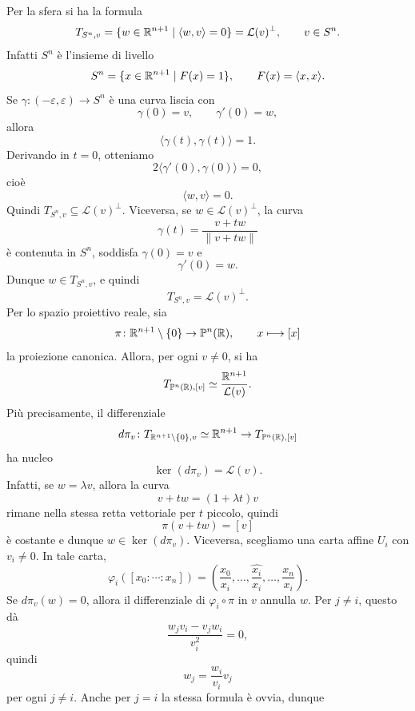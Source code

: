 \documentclass[a4paper]{article}
\begin{document}
\begin{snippetproof}{}
    Per la sfera si ha la formula
    \[
        T_{S^n,v}
        =
        \{w\in\mathbb{R}^{n+1}\mid \langle w,v\rangle=0\}
        =
        \mathcal{L}(v)^\perp,
        \qquad v\in S^n.
    \]
    Infatti \(S^n\) è l'insieme di livello
    \[
        S^n=\{x\in\mathbb{R}^{n+1}\mid F(x)=1\},
        \qquad
        F(x)=\langle x,x\rangle.
    \]
    Se \(\gamma\colon(-\varepsilon,\varepsilon)\to S^n\) è una curva liscia con
    \[
        \gamma(0)=v,
        \qquad
        \gamma'(0)=w,
    \]
    allora
    \[
        \langle\gamma(t),\gamma(t)\rangle=1.
    \]
    Derivando in \(t=0\), otteniamo
    \[
        2\langle\gamma'(0),\gamma(0)\rangle=0,
    \]
    cioè
    \[
        \langle w,v\rangle=0.
    \]
    Quindi \(T_{S^n,v}\subseteq\mathcal{L}(v)^\perp\). Viceversa, se \(w\in\mathcal{L}(v)^\perp\), la curva
    \[
        \gamma(t)=\frac{v+tw}{\left\|v+tw\right\|}
    \]
    è contenuta in \(S^n\), soddisfa \(\gamma(0)=v\) e
    \[
        \gamma'(0)=w.
    \]
    Dunque \(w\in T_{S^n,v}\), e quindi
    \[
        T_{S^n,v}=\mathcal{L}(v)^\perp.
    \]
    Per lo spazio proiettivo reale, sia
    \[
        \pi\colon\mathbb{R}^{n+1}\setminus\{0\}\to\mathbb{P}^n(\mathbb{R}),
        \qquad
        x\longmapsto [x]
    \]
    la proiezione canonica. Allora, per ogni \(v\neq0\), si ha
    \[
        T_{\mathbb{P}^n(\mathbb{R}),[v]}
        \simeq
        \frac{\mathbb{R}^{n+1}}{\mathcal{L}(v)}.
    \]
    Più precisamente, il differenziale
    \[
        d\pi_v\colon T_{\mathbb{R}^{n+1}\setminus\{0\},v}\simeq\mathbb{R}^{n+1}\to T_{\mathbb{P}^n(\mathbb{R}),[v]}
    \]
    ha nucleo
    \[
        \ker(d\pi_v)=\mathcal{L}(v).
    \]
    Infatti, se \(w=\lambda v\), allora la curva
    \[
        v+tw=(1+\lambda t)v
    \]
    rimane nella stessa retta vettoriale per \(t\) piccolo, quindi
    \[
        \pi(v+tw)=[v]
    \]
    è costante e dunque \(w\in\ker(d\pi_v)\).
    Viceversa, scegliamo una carta affine \(U_i\) con \(v_i\neq0\). In tale carta,
    \[
        \varphi_i([x_0:\cdots:x_n])
        =
        \left(
            \frac{x_0}{x_i},
            \dots,
            \widehat{\frac{x_i}{x_i}},
            \dots,
            \frac{x_n}{x_i}
        \right).
    \]
    Se \(d\pi_v(w)=0\), allora il differenziale di \(\varphi_i\circ\pi\) in \(v\) annulla \(w\). Per \(j\neq i\), questo dà
    \[
        \frac{w_jv_i-v_jw_i}{v_i^2}=0,
    \]
    quindi
    \[
        w_j=\frac{w_i}{v_i}v_j
    \]
    per ogni \(j\neq i\). Anche per \(j=i\) la stessa formula è ovvia, dunque

\end{snippetproof}
\end{document}
